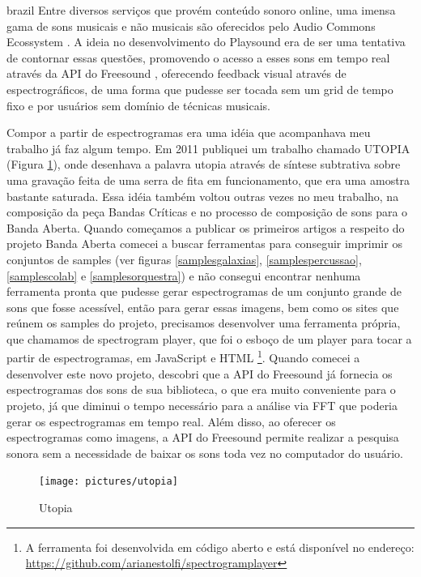 \begin{otherlanguage*}{brazil}
Entre diversos serviços que provém conteúdo sonoro online, uma imensa gama de sons musicais e não musicais são oferecidos pelo Audio Commons Ecossystem \cite{Font2015}. A ideia no desenvolvimento do Playsound era de ser uma tentativa de contornar essas questões, promovendo o acesso a esses sons em tempo real através da API do Freesound \cite{Akkermans2011}, oferecendo feedback visual através de espectrográficos, de uma forma que pudesse ser tocada sem um grid de tempo fixo e por usuários sem domínio de técnicas musicais.

Compor a partir de espectrogramas era uma idéia que acompanhava meu trabalho já faz algum tempo. Em 2011 publiquei um trabalho chamado UTOPIA (Figura \ref{utopia}), onde desenhava a palavra utopia através de síntese subtrativa sobre uma gravação feita de uma serra de fita em funcionamento, que era uma amostra bastante saturada. Essa idéia também voltou outras vezes no meu trabalho, na composição da peça Bandas Críticas e no processo de composição de sons para o Banda Aberta. Quando começamos a publicar os primeiros artigos a respeito do projeto Banda Aberta comecei a buscar ferramentas para conseguir imprimir os conjuntos de samples (ver figuras \ref{samplesgalaxias}, \ref{samplespercussao}, \ref{samplescolab} e \ref{samplesorquestra}) e não consegui encontrar nenhuma ferramenta pronta que pudesse gerar espectrogramas de um conjunto grande de sons que fosse acessível, então para gerar essas imagens, bem como os sites que reúnem os samples do projeto, precisamos desenvolver uma ferramenta própria, que chamamos de spectrogram player, que foi o esboço de um player para tocar a partir de espectrogramas, em JavaScript e HTML \footnote{A ferramenta foi desenvolvida em código aberto e está disponível no endereço: \url{https://github.com/arianestolfi/spectrogramplayer}}. Quando comecei a desenvolver este novo projeto, descobri que a API do Freesound já fornecia os espectrogramas dos sons de sua biblioteca, o que era muito conveniente para o projeto, já que diminui o tempo necessário para a análise via FFT que poderia gerar os espectrogramas em tempo real. Além disso, ao oferecer os espectrogramas como imagens, a API do Freesound permite realizar a pesquisa sonora sem a necessidade de baixar os sons toda vez no computador do usuário.

\begin{figure}
\centering
\texttt{[image: pictures/utopia]}
\caption{\label{pstimeline}Utopia }
\label{utopia}
\end{figure}


\end{otherlanguage*}
